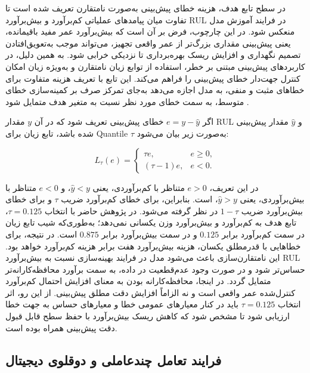 در سطح تابع هدف، هزینه خطای پیش‌بینی به‌صورت نامتقارن
تعریف شده است تا تفاوت میان پیامدهای عملیاتی کم‌برآورد و
بیش‌برآورد \gls{RUL} در فرایند آموزش مدل منعکس شود. در این
چارچوب، فرض بر آن است که بیش‌برآورد عمر مفید باقیمانده، یعنی
پیش‌بینی مقداری بزرگ‌تر از عمر واقعی تجهیز، می‌تواند موجب
به‌تعویق‌افتادن تصمیم نگهداری و افزایش ریسک بهره‌برداری تا
نزدیکی خرابی شود. به همین دلیل، در کاربردهای پیش‌بینی مبتنی بر
خطر، استفاده از توابع زیان نامتقارن و به‌ویژه زیان
 امکان کنترل جهت‌دار خطای پیش‌بینی را فراهم
می‌کند. این تابع با تعریف هزینه متفاوت برای خطاهای مثبت و منفی،
به مدل اجازه می‌دهد به‌جای تمرکز صرف بر کمینه‌سازی خطای متوسط،
به سمت خطای مورد نظر نسبت به متغیر هدف متمایل شود
\cite{Robinson2026riskaware}.

اگر $e=y-\hat{y}$ خطای پیش‌بینی تعریف شود که در آن $y$ مقدار
\gls{RUL}
و $\hat{y}$ مقدار پیش‌بینی شده باشد، تابع زیان 
برای
\gls{Quantile}
 $\tau$ به‌صورت زیر بیان می‌شود:

\begin{equation}
	\label{eq:pinball-loss}
	L_{\tau}(e)
	=
	\begin{cases}
		\tau e, & e \geq 0,\\
		(\tau-1)e, & e < 0.
	\end{cases}
\end{equation}

در این تعریف، 
$e>0$
 متناظر با کم‌برآوردی، یعنی
$\hat{y}<y$،
 و 
 $e<0$ 
 متناظر با بیش‌برآوردی، یعنی
$\hat{y}>y$، است. بنابراین، برای خطای کم‌برآورد ضریب $\tau$ و
برای خطای بیش‌برآورد ضریب $1-\tau$ در نظر گرفته می‌شود. در
پژوهش حاضر با انتخاب $\tau=0.125$، تابع هدف به کم‌برآورد و
بیش‌برآورد وزن یکسانی نمی‌دهد؛ به‌طوری‌که شیب تابع زیان در سمت
کم‌برآورد برابر $0.125$ و در سمت بیش‌برآورد برابر $0.875$ است.
در نتیجه، برای خطاهایی با قدرمطلق یکسان، هزینه بیش‌برآورد
هفت برابر هزینه کم‌برآورد خواهد بود. این نامتقارن‌سازی باعث
می‌شود مدل در فرایند بهینه‌سازی نسبت به بیش‌برآورد \gls{RUL}
حساس‌تر شود و در صورت وجود عدم‌قطعیت در داده، به سمت برآورد
محافظه‌کارانه‌تر متمایل گردد. در اینجا، محافظه‌کارانه بودن به
معنای افزایش احتمال کم‌برآورد کنترل‌شده عمر واقعی است و نه
الزاماً افزایش دقت مطلق پیش‌بینی. از این رو، اثر انتخاب
$\tau=0.125$
 باید در کنار معیارهای عمومی خطا و معیارهای حساس
به جهت خطا ارزیابی شود تا مشخص شود که کاهش ریسک بیش‌برآورد با
حفظ سطح قابل قبول دقت پیش‌بینی همراه بوده است.

\subsection{فرایند تعامل چندعاملی و دوقلوی دیجیتال}
\label{sec:e2e-scenario}

